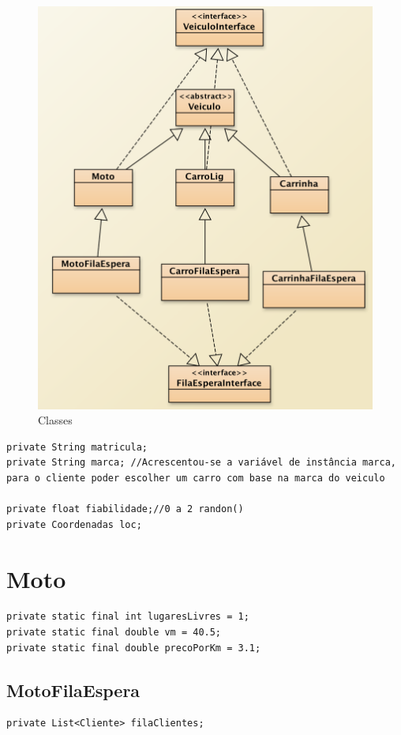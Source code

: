 \begin{figure}[htpb]
	\centering
	\includegraphics[scale=0.6]{imagem/veiculo}
	\caption{Classes }
	\label{p2:fig:p2_veiculos}
\end{figure}

\begin{verbatim}
private String matricula; 
private String marca; //Acrescentou-se a variável de instância marca, 
para o cliente poder escolher um carro com base na marca do veiculo

private float fiabilidade;//0 a 2 randon()
private Coordenadas loc;
\end{verbatim}

\section{Moto}
\begin{verbatim}
private static final int lugaresLivres = 1;
private static final double vm = 40.5; 
private static final double precoPorKm = 3.1;
\end{verbatim}

\subsection{MotoFilaEspera}
\begin{verbatim}
private List<Cliente> filaClientes;
\end{verbatim}

